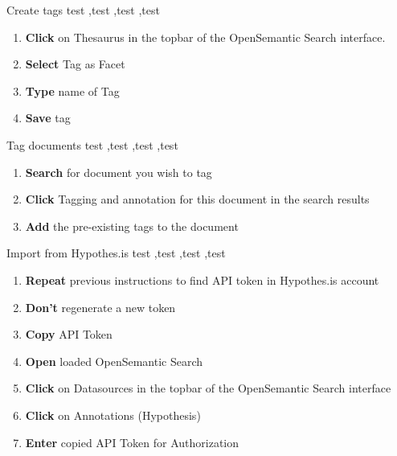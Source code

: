 \documentclass[10pt,a4paper]{article}
\begin{document}
\begin{textbox}{Create tags}
test  \sep test \sep test \sep test

\bigskip

\begin{enumerate}
\item \textbf{Click} on Thesaurus in the topbar of the OpenSemantic Search interface.
\item \textbf{Select} Tag as Facet 
\item \textbf{Type} name of Tag 
\item \textbf{Save} tag 
 
\end{enumerate}

\end{textbox}

\begin{textbox}{Tag documents}
test  \sep test \sep test \sep test

\bigskip

\begin{enumerate}
\item \textbf{Search} for document you wish to tag
\item \textbf{Click} Tagging and annotation for this document in the search results
\item \textbf{Add} the pre-existing tags to the document 
\end{enumerate}

\end{textbox}


\begin{textbox}{Import from Hypothes.is}
test  \sep test \sep test \sep test


\bigskip

\begin{enumerate}
\item \textbf{Repeat} previous instructions to find API token in Hypothes.is account 
\item \textbf{Don't} regenerate a new token
\item \textbf{Copy} API Token
\item \textbf{Open} loaded OpenSemantic Search
\item \textbf{Click} on Datasources in the topbar of the OpenSemantic Search interface
\item \textbf{Click} on Annotations (Hypothesis)
\item \textbf{Enter} copied API Token for Authorization
\end{enumerate}


\end{textbox}
\end{document}
